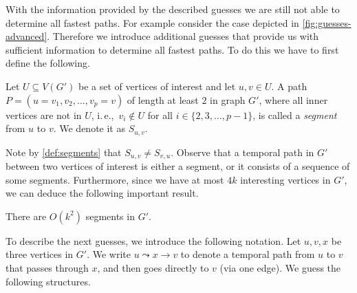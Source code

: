 \documentclass[a4paper,UKenglish,cleveref, autoref, thm-restate, anonymous]{lipics-v2021}
\newcommand{\ie}{i.\,e.,\ }
\begin{document}
With the information provided by the described guesses we are still not able to determine all fastest paths. For example consider the case depicted in \cref{fig:guesses-advanced}. 
Therefore we introduce additional guesses that provide us with sufficient information to determine all fastest paths. To do this we have to first define the following.
\begin{definition}\label{def:segments}
	Let $U \subseteq V(G')$ be a set of vertices of interest and let $u,v \in U$.
	A path $P = (u=v_1,v_2, \dots, v_p = v)$ of length at least $2$ in graph $G'$, where all inner vertices are not in $U$, \ie $v_i \notin U$ for all $i \in \{ 2, 3, \dots, p-1\}$,
	is called a \emph{segment} from $u$ to $v$. We denote it as $S_{u,v}$.
\end{definition}
Note by \cref{def:segments} that $S_{u,v} \neq S_{v,u}$. 
Observe that a temporal path in $G'$ between two vertices of interest is either a segment, or it consists of a sequence of some segments. Furthermore, since we have at most $4k$ interesting vertices in $G'$, we can deduce the following important result.
\begin{corollary}\label{obs:FPT-k2segments}
	There are $O(k^2)$ segments in $G'$.
\end{corollary}
To describe the next guesses, we introduce the following notation. Let $u,v,x$ be three vertices in $G'$. We write $u \leadsto x \rightarrow v$ to denote a temporal path from $u$ to $v$ that passes through $x$, and then goes directly to $v$ (via one edge).
We guess the following structures.
\end{document}
